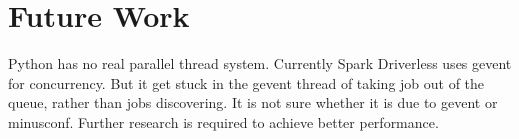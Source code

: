 
\section{Future Work} %
\label{sec:future_work}
Python has no real parallel thread system.
Currently Spark Driverless uses gevent for concurrency.
But it get stuck in the gevent thread of taking job out of the queue,
rather than jobs discovering.
It is not sure whether it is due to gevent or minusconf.
Further research is required to achieve better performance.

